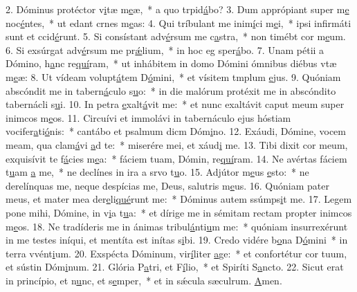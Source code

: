 2. Dóminus protéctor v\uline{i}tæ m\uline{e}æ,~* a quo trpid\uline{á}bo?
3. Dum apprópiant super m\uline{e} noc\uline{é}ntes,~* ut edant crnes m\uline{e}as:
4. Qui tríbulant me inim\uline{í}ci m\uline{e}i,~* ipsi infirmáti sunt et ccid\uline{é}runt.
5. Si consístant adv\uline{é}rsum me c\uline{a}stra,~* non timébt cor m\uline{e}um.
6. Si exsúrgat adv\uline{é}rsum me pr\uline{ǽ}lium,~* in hoc eg sper\uline{á}bo.
7. Unam pétii a Dómino, h\uline{a}nc re\uline{quí}ram,~* ut inhábitem in domo Dómini ómnibus diébus vtæ m\uline{e}æ:
8. Ut vídeam volupt\uline{á}tem D\uline{ó}mini,~* et vísitem tmplum \uline{e}jus.
9. Quóniam abscóndit me in tabern\uline{á}culo s\uline{u}o:~* in die malórum protéxit me in abscóndito tabernácli s\uline{u}i.
10. In petra \uline{e}xalt\uline{á}vit me:~* et nunc exaltávit caput meum super inimcos m\uline{e}os.
11. Circuívi et immolávi in tabernáculo ejus hóstiam vocifer\uline{a}ti\uline{ó}nis:~* cantábo et psalmum dicm Dóm\uline{i}no.
12. Exáudi, Dómine, vocem meam, qua clam\uline{á}vi \uline{a}d te:~* miserére mei, et xáud\uline{i} me.
13. Tibi dixit cor meum, exquisívit te f\uline{á}cies m\uline{e}a:~* fáciem tuam, Dómin, re\uline{quí}ram.
14. Ne avértas fáciem t\uline{u}am \uline{a} me,~* ne declínes in ira a srvo t\uline{u}o.
15. Adjútor m\uline{e}us \uline{e}sto:~* ne derelínquas me, neque despícias me, Deus, salutris m\uline{e}us.
16. Quóniam pater meus, et mater mea der\uline{e}li\uline{qué}runt me:~* Dóminus autem ssúmps\uline{i}t me.
17. Legem pone mihi, Dómine, in v\uline{i}a t\uline{u}a:~* et dírige me in sémitam rectam propter inimcos m\uline{e}os.
18. Ne tradíderis me in ánimas tribul\uline{á}nti\uline{u}m me:~* quóniam insurrexérunt in me testes iníqui, et mentíta est inítas s\uline{i}bi.
19. Credo vidére b\uline{o}na D\uline{ó}mini~* in terra vvént\uline{i}um.
20. Exspécta Dóminum, vir\uline{í}liter \uline{a}ge:~* et confortétur cor tuum, et sústin Dóm\uline{i}num.
21. Glória P\uline{a}tri, et F\uline{í}lio,~* et Spiríti S\uline{a}ncto.
22. Sicut erat in princípio, et n\uline{u}nc, et s\uline{e}mper,~* et in sǽcula sæculrum. \uline{A}men.
